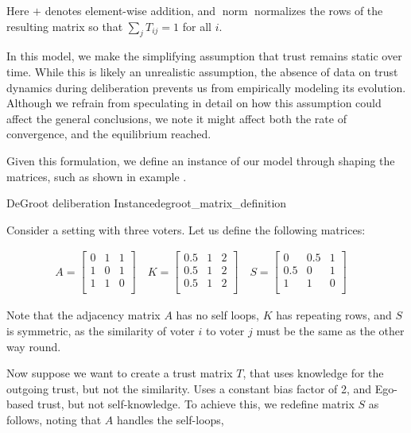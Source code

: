 Here $+$ denotes element-wise addition, and $\operatorname{norm}$ normalizes the rows of the resulting matrix so that $\sum_j T_{ij} = 1$ for all $i$.


In this model, we make the simplifying assumption that trust remains static
over time. While this is likely an unrealistic assumption, the absence of data on
trust dynamics during deliberation prevents us from empirically modeling its
evolution. Although we refrain from speculating in detail on how this
assumption could affect the general conclusions, we note it might affect both
the rate of convergence, and the equilibrium reached.

Given this formulation, we define an instance of our model through shaping the
matrices, such as shown in example .

\begin{example}{DeGroot deliberation Instance}{degroot_matrix_definition}

	Consider a setting with three voters. Let us define the following matrices:

	\begin{align}
		A = \begin{bmatrix}
			    0 & 1 & 1 \\
			    1 & 0 & 1 \\
			    1 & 1 & 0 \\
		    \end{bmatrix} \quad
		K = \begin{bmatrix}
			    0.5 & 1 & 2 \\
			    0.5 & 1 & 2 \\
			    0.5 & 1 & 2 \\
		    \end{bmatrix}\quad
		S = \begin{bmatrix}
			    0   & 0.5 & 1 \\
			    0.5 & 0   & 1 \\
			    1   & 1   & 0 \\
		    \end{bmatrix}\quad
	\end{align}

	Note that the adjacency matrix $A$ has no self loops, $K$ has repeating
	rows, and $S$ is symmetric, as the similarity of voter $i$ to voter $j$
	must be the same as the other way round.

	Now suppose we want to create a trust matrix $T$, that uses knowledge for the
	outgoing trust, but not the similarity. Uses a constant bias
	factor of 2, and Ego-based trust, but not self-knowledge. To achieve
	this, we redefine matrix $S$ as follows, noting that $A$ handles the self-loops,


\end{example}
